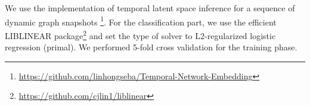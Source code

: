 We use the implementation of temporal latent space inference for a sequence of dynamic graph snapshots \footnote{\url{https://github.com/linhongseba/Temporal-Network-Embedding}}\cite{Zhu2016}.
 For the classification part, we use the efficient LIBLINEAR \cite{fan2008liblinear} package\footnote{\url{https://github.com/cjlin1/liblinear}} and set the type of solver to L2-regularized logistic regression (primal). %
We performed 5-fold cross validation for the training phase.












